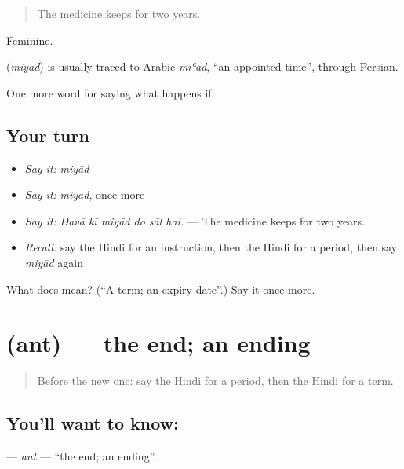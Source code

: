\begin{quote}
The medicine keeps for two years.
\end{quote}

Feminine.

\begin{cousinweb}
\textbf{} (\emph{miyād}) is usually traced to Arabic \emph{mīʿād}, \textquotedblleft{}an appointed time\textquotedblright{}, through Persian.
\end{cousinweb}

\begin{grammarlens}[title={What you've built}]
One more word for saying what happens if.
\end{grammarlens}

\subsection*{Your turn}
\begin{itemize}
\raggedright
  \item \emph{Say it:} \emph{miyād}
  \item \emph{Say it:} \emph{miyād}, once more
  \item \emph{Say it:} \emph{Davā kī miyād do sāl hai.} — The medicine keeps for two years.
  \item \emph{Recall:} say the Hindi for an instruction, then the Hindi for a period, then say \emph{miyād} again
\end{itemize}

\begin{tcolorbox}[breakable,colback=teal!4,colframe=teal!35!black,title={Before you move on}]
What does  mean? (\textquotedblleft{}A term; an expiry date\textquotedblright{}.) Say it once more.
\end{tcolorbox}
\section[\texorpdfstring{\hi{अंत} (ant)}{अंत (ant)}]{ (ant) — the end; an ending}

\label{lesson:HI-C548-ant}



\begin{quote}
Before the new one: say the Hindi for a period, then the Hindi for a term.
\end{quote}

\subsection*{You'll want to know: }
\textbf{} — \emph{ant} — \textquotedblleft{}the end; an ending\textquotedblright{}.

